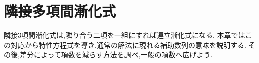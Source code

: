 \chapter{隣接多項間漸化式}\label{章：隣接多項間漸化式}
\begin{bookcolumns}
隣接3項間漸化式は,隣り合う二項を一組にすれば連立漸化式になる.
本章ではこの対応から特性方程式を導き,通常の解法に現れる補助数列の意味を説明する.
その後,差分によって項数を減らす方法を調べ,一般の項数へ広げよう.



\end{bookcolumns}

